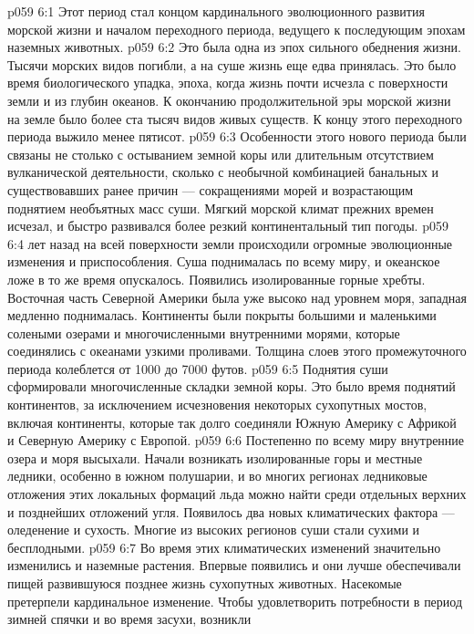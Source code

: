 \vs p059 6:1 Этот период стал концом кардинального эволюционного развития морской жизни и началом переходного периода, ведущего к последующим эпохам наземных животных.
\vs p059 6:2 Это была одна из эпох сильного обеднения жизни. Тысячи морских видов погибли, а на суше жизнь еще едва принялась. Это было время биологического упадка, эпоха, когда жизнь почти исчезла с поверхности земли и из глубин океанов. К окончанию продолжительной эры морской жизни на земле было более ста тысяч видов живых существ. К концу этого переходного периода выжило менее пятисот.
\vs p059 6:3 Особенности этого нового периода были связаны не столько с остыванием земной коры или длительным отсутствием вулканической деятельности, сколько с необычной комбинацией банальных и существовавших ранее причин --- сокращениями морей и возрастающим поднятием необъятных масс суши. Мягкий морской климат прежних времен исчезал, и быстро развивался более резкий континентальный тип погоды.
\vs p059 6:4 \pc {} лет назад на всей поверхности земли происходили огромные эволюционные изменения и приспособления. Суша поднималась по всему миру, и океанское ложе в то же время опускалось. Появились изолированные горные хребты. Восточная часть Северной Америки была уже высоко над уровнем моря, западная медленно поднималась. Континенты были покрыты большими и маленькими солеными озерами и многочисленными внутренними морями, которые соединялись с океанами узкими проливами. Толщина слоев этого промежуточного периода колеблется от 1000 до 7000 футов.
\vs p059 6:5 Поднятия суши сформировали многочисленные складки земной коры. Это было время поднятий континентов, за исключением исчезновения некоторых сухопутных мостов, включая континенты, которые так долго соединяли Южную Америку с Африкой и Северную Америку с Европой.
\vs p059 6:6 Постепенно по всему миру внутренние озера и моря высыхали. Начали возникать изолированные горы и местные ледники, особенно в южном полушарии, и во многих регионах ледниковые отложения этих локальных формаций льда можно найти среди отдельных верхних и позднейших отложений угля. Появилось два новых климатических фактора --- оледенение и сухость. Многие из высоких регионов суши стали сухими и бесплодными.
\vs p059 6:7 \pc Во время этих климатических изменений значительно изменились и наземные растения. Впервые появились  и они лучше обеспечивали пищей развившуюся позднее жизнь сухопутных животных. Насекомые претерпели кардинальное изменение. Чтобы удовлетворить потребности в период зимней спячки и во время засухи, возникли 
